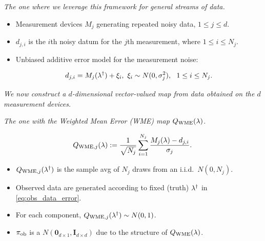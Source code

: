 \begin{frame}[t]{\it The one where we leverage this framework for general streams of data.}

\begin{itemize}
  \item Measurement devices $M_j$ generating repeated noisy data, $1\leq j\leq d$.

  \bigskip
  \item $d_{j,i}$ is the $i$th noisy datum for the $j$th measurement, where $1\leq i\leq N_j$.

  \bigskip
  \item Unbiased additive error model for the measurement noise:

  \begin{equation}\label{eq:obs_data_error}
  	d_{j,i} = M_j(\paramref) + \xi_i, \ \xi_i\sim N(0,\sigma_j^2), \ \ 1\leq i\leq N_j.
  \end{equation}

\end{itemize}

\bigskip
\bigskip
\centering
{\it We now construct a $d$-dimensional vector-valued map from data obtained on the $d$ measurement devices.}

\end{frame}


\begin{frame}{\it The one with the Weighted Mean Error (WME) map $Q_\text{WME}(\lambda)$.}

\begin{equation}\label{eq:qoi_WME}
	Q_{\text{WME},j}(\lambda) := \frac{1}{\sqrt{N_j}} \sum_{i=1}^{N_j} \frac{M_j(\lambda)-d_{j,i}}{\sigma_j}.
\end{equation}

\bigskip
\begin{itemize}
  \item $Q_{\text{WME},j}(\lambda^\dagger)$ is the sample avg of $N_j$ draws from an i.i.d.~$N(0,N_j)$.

  \bigskip
  \item Observed data are generated according to fixed (truth) $\lambda^\dagger$ in \eqref{eq:obs_data_error}.

  \bigskip
  \item For each component, $Q_{\text{WME},j}(\lambda^\dagger) \sim N(0, 1)$.

  \bigskip
  \item $\operatorname*{\pi_{ob}}$ is a $N(\mathbf{0}_{d\times 1},\mathbf{I}_{d\times d})$ due to the structure of $Q_\text{WME}(\lambda)$.

\end{itemize}


\end{frame}

